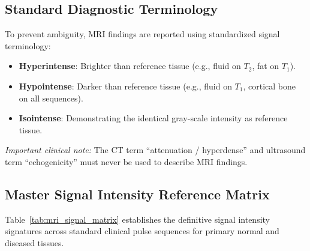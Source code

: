 \documentclass[11pt,a4paper]{article}
\begin{document}
\subsection{Standard Diagnostic Terminology}
To prevent ambiguity, MRI findings are reported using standardized signal terminology:
\begin{itemize}
    \item \textbf{Hyperintense}: Brighter than reference tissue (e.g., fluid on $T_2$, fat on $T_1$).
    \item \textbf{Hypointense}: Darker than reference tissue (e.g., fluid on $T_1$, cortical bone on all sequences).
    \item \textbf{Isointense}: Demonstrating the identical gray-scale intensity as reference tissue.
\end{itemize}
\emph{Important clinical note:} The CT term ``attenuation / hyperdense'' and ultrasound term ``echogenicity'' must never be used to describe MRI findings.

\subsection{Master Signal Intensity Reference Matrix}
Table~\ref{tab:mri_signal_matrix} establishes the definitive signal intensity signatures across standard clinical pulse sequences for primary normal and diseased tissues.
\end{document}
